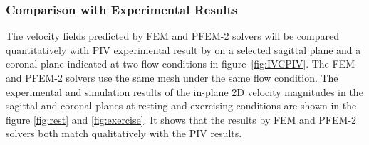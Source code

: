 \subsubsection*{Comparison with Experimental Results}

The velocity fields predicted by FEM and PFEM-2 solvers will be compared quantitatively with PIV experimental result by \cite{gallagher_exp} on a selected sagittal plane and a coronal plane indicated at two flow conditions in figure~\ref{fig:IVCPIV}. The FEM and PFEM-2 solvers use the same mesh under the same flow condition. The experimental and simulation results of the in-plane 2D velocity magnitudes in the sagittal and coronal planes at resting and exercising conditions are shown in the figure \ref{fig:rest} and \ref{fig:exercise}. It shows that the results by FEM and PFEM-2 solvers both match qualitatively with the PIV results. 


